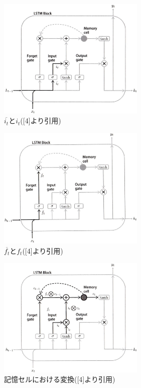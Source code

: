 \documentclass[twocolumn]{jsarticle}
\begin{document}
\begin{figure}[H]
	\centering
	\includegraphics[width=7cm]{input_gate.jpg}
	\caption{$\overline{i_t}$と$i_t$([4]より引用)}
	\label{fig010}
\end{figure}

\begin{figure}[H]
	\centering
	\includegraphics[width=7cm]{forget_gate.jpg}
	\caption{$\overline{f_t}$と$f_t$([4]より引用)}
	\label{fig11}
\end{figure}

\begin{figure}[H]
	\centering
	\includegraphics[width=7cm]{memory_cell.jpg}
	\caption{記憶セルにおける変換([4]より引用)}
	\label{fig12}
\end{figure}
\end{document}
